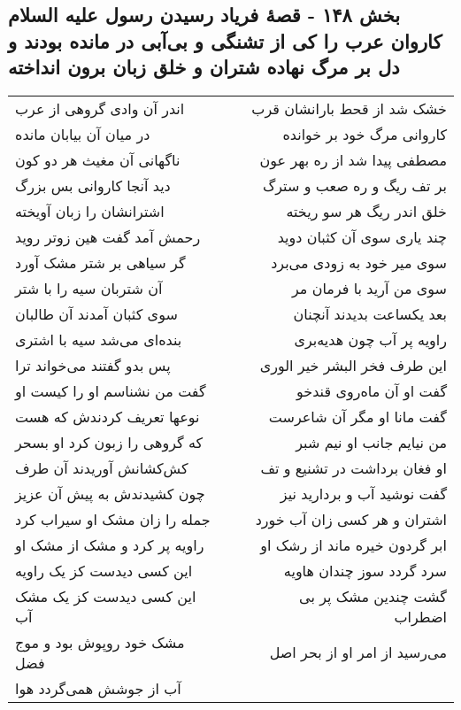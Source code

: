 \begin{center}
\section*{بخش ۱۴۸ - قصهٔ فریاد رسیدن رسول علیه السلام کاروان عرب را کی از تشنگی و بی‌آبی در مانده بودند و دل بر مرگ نهاده شتران و خلق زبان برون انداخته}
\label{sec:sh148}
\begin{longtable}{l p{0.5cm} r}
اندر آن وادی گروهی از عرب
&&
خشک شد از قحط بارانشان قرب
\\
در میان آن بیابان مانده
&&
کاروانی مرگ خود بر خوانده
\\
ناگهانی آن مغیث هر دو کون
&&
مصطفی پیدا شد از ره بهر عون
\\
دید آنجا کاروانی بس بزرگ
&&
بر تف ریگ و ره صعب و سترگ
\\
اشترانشان را زبان آویخته
&&
خلق اندر ریگ هر سو ریخته
\\
رحمش آمد گفت هین زوتر روید
&&
چند یاری سوی آن کثبان دوید
\\
گر سیاهی بر شتر مشک آورد
&&
سوی میر خود به زودی می‌برد
\\
آن شتربان سیه را با شتر
&&
سوی من آرید با فرمان مر
\\
سوی کثبان آمدند آن طالبان
&&
بعد یکساعت بدیدند آنچنان
\\
بنده‌ای می‌شد سیه با اشتری
&&
راویه پر آب چون هدیه‌بری
\\
پس بدو گفتند می‌خواند ترا
&&
این طرف فخر البشر خیر الوری
\\
گفت من نشناسم او را کیست او
&&
گفت او آن ماه‌روی قندخو
\\
نوعها تعریف کردندش که هست
&&
گفت مانا او مگر آن شاعرست
\\
که گروهی را زبون کرد او بسحر
&&
من نیایم جانب او نیم شبر
\\
کش‌کشانش آوریدند آن طرف
&&
او فغان برداشت در تشنیع و تف
\\
چون کشیدندش به پیش آن عزیز
&&
گفت نوشید آب و بردارید نیز
\\
جمله را زان مشک او سیراب کرد
&&
اشتران و هر کسی زان آب خورد
\\
راویه پر کرد و مشک از مشک او
&&
ابر گردون خیره ماند از رشک او
\\
این کسی دیدست کز یک راویه
&&
سرد گردد سوز چندان هاویه
\\
این کسی دیدست کز یک مشک آب
&&
گشت چندین مشک پر بی اضطراب
\\
مشک خود روپوش بود و موج فضل
&&
می‌رسید از امر او از بحر اصل
\\
آب از جوشش همی‌گردد هوا

\end{longtable}
\end{center}

